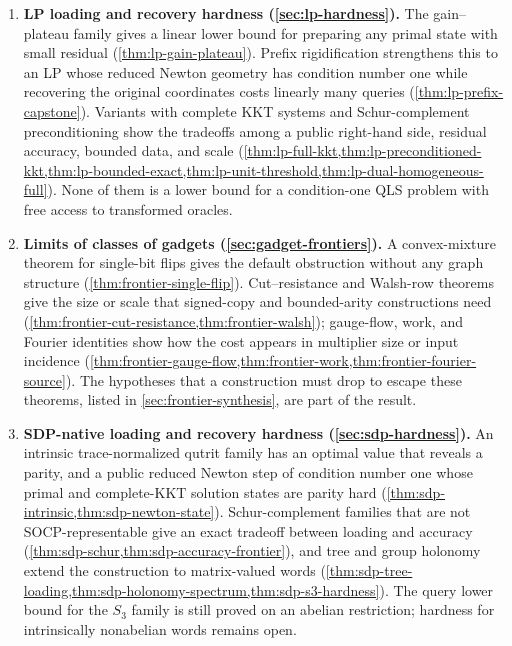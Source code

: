 \begin{enumerate}[leftmargin=*]
 \item \textbf{LP loading and recovery hardness
 (\cref{sec:lp-hardness}).}  The gain--plateau family gives a linear lower
 bound for preparing any primal state with small residual
 (\cref{thm:lp-gain-plateau}).  Prefix rigidification strengthens this to an
 LP whose reduced Newton geometry has condition number one while recovering
 the original coordinates costs linearly many queries
 (\cref{thm:lp-prefix-capstone}).  Variants with complete KKT systems and
 Schur-complement preconditioning show the tradeoffs among a public
 right-hand side, residual accuracy, bounded data, and scale
 (\cref{thm:lp-full-kkt,thm:lp-preconditioned-kkt,thm:lp-bounded-exact,thm:lp-unit-threshold,thm:lp-dual-homogeneous-full}).
 None of them is a lower bound for a condition-one QLS problem with free
 access to transformed oracles.

 \item \textbf{Limits of classes of gadgets
 (\cref{sec:gadget-frontiers}).}  A convex-mixture theorem for single-bit
 flips gives the default obstruction without any graph structure
 (\cref{thm:frontier-single-flip}).  Cut--resistance and Walsh-row theorems
 give the size or scale that signed-copy and bounded-arity constructions
 need (\cref{thm:frontier-cut-resistance,thm:frontier-walsh}); gauge-flow,
 work, and Fourier identities show how the cost appears in multiplier size
 or input incidence
 (\cref{thm:frontier-gauge-flow,thm:frontier-work,thm:frontier-fourier-source}).
 The hypotheses that a construction must drop to escape these theorems,
 listed in \cref{sec:frontier-synthesis}, are part of the result.

 \item \textbf{SDP-native loading and recovery hardness
 (\cref{sec:sdp-hardness}).}  An intrinsic trace-normalized qutrit family has
 an optimal value that reveals a parity, and a public reduced Newton step of
 condition number one whose primal and complete-KKT solution states are
 parity hard (\cref{thm:sdp-intrinsic,thm:sdp-newton-state}).  Schur-complement
 families that are not SOCP-representable give an exact tradeoff between
 loading and accuracy (\cref{thm:sdp-schur,thm:sdp-accuracy-frontier}), and
 tree and group holonomy extend the construction to matrix-valued words
 (\cref{thm:sdp-tree-loading,thm:sdp-holonomy-spectrum,thm:sdp-s3-hardness}).
 The query lower bound for the \(S_3\) family is still proved on an abelian
 restriction; hardness for intrinsically nonabelian words remains open.


\end{enumerate}
